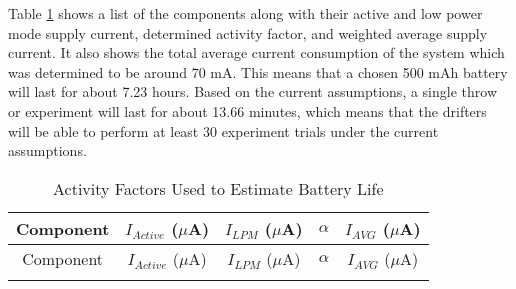 Table \ref{tab:batLife} shows a list of the components along with their active and low power mode supply current, determined activity factor, and weighted average supply current.  It also shows the total average current consumption of the system which was determined to be  around 70 mA.  This means that a chosen 500 mAh battery will last for about 7.23 hours.  Based on the current assumptions, a single throw or experiment will last for about 13.66 minutes, which means that the drifters will be able to perform at least 30 experiment trials under the current assumptions.
\begin{center}
 \begin{longtable}{|c|c|c|c|c|}
    \caption{Activity Factors Used to Estimate Battery Life  \label{tab:batLife}} \\
     \hline
    \rowcolor{Gray}
    Component & $I_{Active}$ ($\mu$A) & $I_{LPM}$ ($\mu$A) &  $\alpha$ & $I_{AVG}$ ($\mu$A) \\
    \hline \hline \endfirsthead
    
         \hline
   \rowcolor{Gray}
    Component & $I_{Active}$ ($\mu$A) & $I_{LPM}$ ($\mu$A) &  $\alpha$ & $I_{AVG}$ ($\mu$A) \\
    \hline \hline \endhead
    
    \endfoot


\end{longtable}
\end{center}
